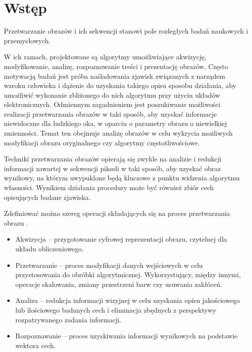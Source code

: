 \chapter{Wstęp}
\label{cha:intruduction}


Przetwarzanie obrazów i ich sekwencji stanowi pole rozległych badań naukowych i przemysłowych. %

W ich ramach, projektowane są algorytmy umożliwiające akwizycję, modyfikowanie, analizę, rozpoznawanie treści i prezentację obrazów. %
Często motywacją badań jest próba naśladowania zjawisk związanych z narządem wzroku człowieka i dążenie do uzyskania takiego opisu sposobu działania, aby umożliwić wykonanie zbliżonego do nich algorytmu przy użyciu układów elektronicznych. %
Odmiennym zagadnieniem jest poszukiwanie możliwości realizacji przetwarzania obrazów w taki sposób, aby uzyskać informacje niewidoczne dla ludzkiego oka, w oparciu o parametry obrazu o niewielkiej zmienności. Temat ten obejmuje analizę obrazów w celu wykrycia możliwych modyfikacji obrazu oryginalnego czy algorytmy częstotliwościowe. %

Techniki przetwarzania obrazów opierają się zwykle na analizie i redukcji informacji zawartej w sekwencji pikseli w taki sposób, aby uzyskać obraz wynikowy, na którym uwypuklone będą kluczowe z punktu widzenia algorytmu własności. %
Wynikiem działania procedury może być również zbiór cech opisujących badane zjawiska.

Zdefiniować można szereg operacji składających się na proces przetwarzania obrazu \cite{Tadeusiewicz1997}.
\begin{itemize}
	\item Akwizycja -- przygotowanie cyfrowej reprezentacji obrazu, czytelnej dla układu obliczeniowego.
	
	\item Przetwarzanie -- proces modyfikacji danych wejściowych w celu przystosowania do obróbki algorytmicznej. Wykorzystujący, między innymi, operacje skalowania, zmiany przestrzeni barw czy usuwania zakłóceń.
	
	\item Analiza -- redukcja informacji wizyjnej w celu uzyskania opisu jakościowego lub ilościowego badanych cech i eliminacja zbędnych z perspektywy rozpatrywanego zadania informacji.
	
	\item Rozpoznawanie -- proces uzyskiwania informacji wynikowych na podstawie wektora cech.
\end{itemize}

